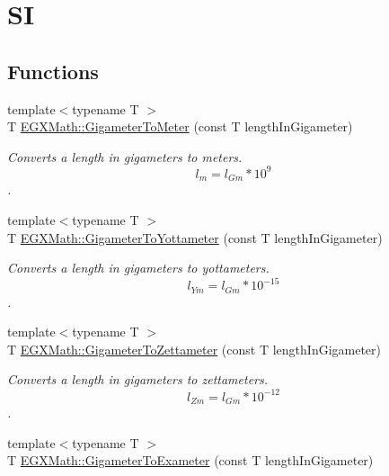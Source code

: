 \hypertarget{group___e_g_x_math-_conversions-_length_conversions-_gigameter-_s_i}{}\section{SI}
\label{group___e_g_x_math-_conversions-_length_conversions-_gigameter-_s_i}
\subsection*{Functions}
\begin{DoxyCompactItemize}
\item 
{\footnotesize template$<$typename T $>$ }\\T \mbox{\hyperlink{group___e_g_x_math-_conversions-_length_conversions-_gigameter-_s_i_ga9573f9c296bf9043de80f6f6b13c0aa9}{E\+G\+X\+Math\+::\+Gigameter\+To\+Meter}} (const T length\+In\+Gigameter)
\begin{DoxyCompactList}\small\item\em Converts a length in gigameters to meters. \[ l_{m}=l_{Gm} * 10^{9}\]. \end{DoxyCompactList}\item 
{\footnotesize template$<$typename T $>$ }\\T \mbox{\hyperlink{group___e_g_x_math-_conversions-_length_conversions-_gigameter-_s_i_ga311d6ae40f97487de660c9fb0310ec5e}{E\+G\+X\+Math\+::\+Gigameter\+To\+Yottameter}} (const T length\+In\+Gigameter)
\begin{DoxyCompactList}\small\item\em Converts a length in gigameters to yottameters. \[ l_{Ym}=l_{Gm} * 10^{-15} \]. \end{DoxyCompactList}\item 
{\footnotesize template$<$typename T $>$ }\\T \mbox{\hyperlink{group___e_g_x_math-_conversions-_length_conversions-_gigameter-_s_i_gaaaefaf67b876bfdeccd8176508e765e3}{E\+G\+X\+Math\+::\+Gigameter\+To\+Zettameter}} (const T length\+In\+Gigameter)
\begin{DoxyCompactList}\small\item\em Converts a length in gigameters to zettameters. \[ l_{Zm}=l_{Gm} * 10^{-12} \]. \end{DoxyCompactList}\item 
{\footnotesize template$<$typename T $>$ }\\T \mbox{\hyperlink{group___e_g_x_math-_conversions-_length_conversions-_gigameter-_s_i_ga38ebe6bd7f8d4dd09cadc8d08caf90eb}{E\+G\+X\+Math\+::\+Gigameter\+To\+Exameter}} (const T length\+In\+Gigameter)

\end{DoxyCompactItemize}
